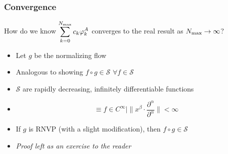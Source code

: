 \begin{frame}
    \frametitle{Convergence}
    How do we know $\displaystyle{\sum_{k=0}^{N_{\text{max}}}c_k \varphi_k^A}$ converges to the real result as ${N_{\text{max}}} \to \infty$?
    \begin{itemize}
        \item Let $g$ be the normalizing flow
        \item Analogous to showing $f \circ g \in \mathcal{S}\,\, \forall f \in \mathcal{S}$
        \item $\mathcal{S}$ are rapidly decreasing, infinitely differentiable functions
        \item \[ \equiv f \in C^\infty | \|x^\beta \cdot \frac{\partial^\alpha}{\partial^\alpha}\| < \infty \]
        \item If $g$ is RNVP (with a slight modification), then $f \circ g \in \mathcal{S}$
        \item \textit{Proof left as an exercise to the reader}
    \end{itemize}
\end{frame}